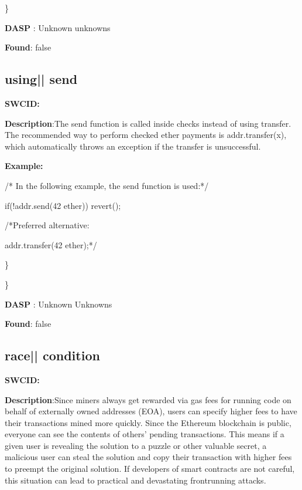 \documentclass{article}
\begin{document}
\} 

\textbf{DASP} : Unknown unknowns

\textbf{Found}: false

\subsection{using{|\textunderscore| }send} 
\textbf{SWC{\textunderscore }ID:} 

\textbf{Description}:The send function is called inside checks instead of using transfer. The recommended way to perform checked ether payments is addr.transfer(x), which automatically throws an exception if the transfer is unsuccessful.


\textbf{Example:} 
\begin{ffcode} 

/* In the following example, the send function is used:*/ 


if(!addr.send(42 ether)) {
    revert();
}

 /*Preferred alternative:

addr.transfer(42 ether);*/ 

\end{ffcode} 
\} 

\} 

\textbf{DASP} : Unknown Unknowns

\textbf{Found}: false

\subsection{race{|\textunderscore| }condition} 
\textbf{SWC{\textunderscore }ID:} 

\textbf{Description}:Since miners always get rewarded via gas fees for running code on behalf of externally owned addresses (EOA), users can specify higher fees to have their transactions mined more quickly. Since the Ethereum blockchain is public, everyone can see the contents of others' pending transactions. This means if a given user is revealing the solution to a puzzle or other valuable secret, a malicious user can steal the solution and copy their transaction with higher fees to preempt the original solution. If developers of smart contracts are not careful, this situation can lead to practical and devastating front{\textendash}running attacks.
\end{document}
